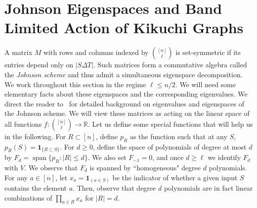 \documentclass
[11pt,letterpaper]
{article}
\providecommand*{\R}{\mathbb R}
\renewcommand{\epsilon}{\varepsilon}
\newtheorem{definition}[theorem]{Definition}
\newcommand{\one}{\mathbf 1}
\begin{document}


\section{Johnson Eigenspaces and Band Limited Action of Kikuchi Graphs} \label{sec:johnson-band-limited}
A matrix $M$ with rows and columns indexed by ${[n] \choose \ell}$ is set-symmetric if its entries depend only on $|S \Delta T|$. Such matrices form a commutative algebra called the \emph{Johnson scheme} and thus admit a simultaneous eigenspace decomposition. We work throughout this section in the regime $\ell \leq n/2$. We will need some elementary facts about these eigenspaces and the corresponding eigenvalues. We direct the reader to~\cite{Godsil93} for detailed background on eigenvalues and eigenspaces of the Johnson scheme. We will view these matrices as acting on the linear space of all functions $f:{[n] \choose \ell} \rightarrow \R$. Let us define some special functions that will help us in the following.  
For \(R\subset[n]\), define $p_R$ as the function such that at any $S$, $p_R(S)=\one_{\{R\subset S\}}$.
For \(d\ge 0\), define the space of polynomials of degree at most $d$ by $F_d=\operatorname{span}\{p_R: |R|\le d\}$. We also set \(F_{-1}=0\), and once \(d\ge \ell\) we identify \(F_d\) with \(V\). We observe that $F_d$ is spanned by ``homogeneous" degree $d$ polynomials. For any $a \in [n]$, let $x_a = \one_{(a \in S)}$ be the indicator of whether a given input $S$ contains the element $a$. Then, observe that degree $d$ polynomials are in fact linear combinations of $\prod_{a \in R} x_a$ for $|R| = d$. 
\end{document}
